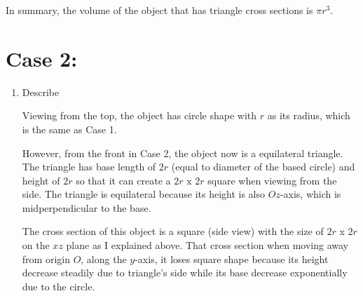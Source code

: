 \documentclass[12pt]{article}
\begin{document}
\begin{enumerate}
\begin{itemize}
    In summary, the volume of the object that has triangle cross sections is $\pi r^3$.
    
    \end{itemize}

    
    \end{enumerate}

    
    \vspace{2cm}
\newpage
\section*{Case 2:}
    
    \begin{enumerate}
        \item Describe \par
        Viewing from the top, the object has circle shape with $r$ as its radius, which is the same as Case 1.
        
        However, from the front in Case 2, the object now is a equilateral triangle. The triangle has base length of $2r$ (equal to diameter of the based circle) and height of $2r$ so that it can create a $2r$ x $2r$ square when viewing from the side. The triangle is equilateral because its height is also $Oz$-axis, which is midperpendicular to the base.
        
        The cross section of this object is a square (side view) with the size of $2r$ x $2r$ on the $xz$ plane as I explained above. That cross section when moving away from origin $O$, along the $y$-axis, it loses square shape because its height decrease steadily due to triangle's side while its base decrease exponentially due to the circle.
        \par
    
\end{enumerate}
\end{document}
